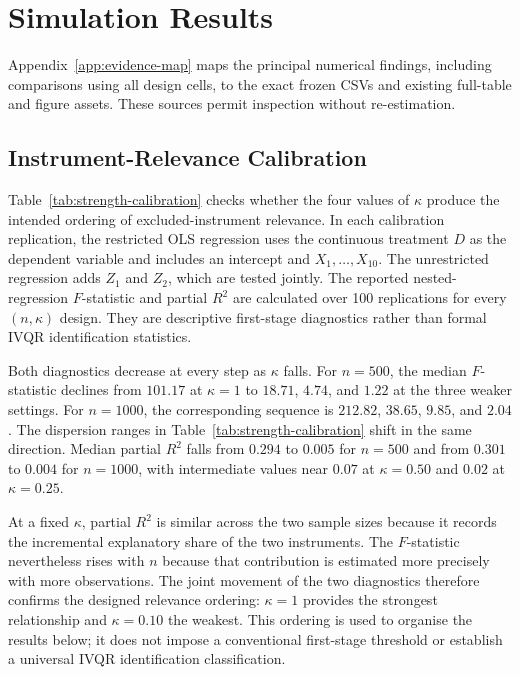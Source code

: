 \section{Simulation Results}
\label{chap:results}
Appendix~\ref{app:evidence-map} maps the principal numerical findings, including comparisons using all design cells, to the exact frozen CSVs and existing full-table and figure assets. These sources permit inspection without re-estimation.
\subsection{Instrument-Relevance Calibration}
\label{sec:results-relevance-calibration}

Table~\ref{tab:strength-calibration} checks whether the four values of $\kappa$ produce the intended ordering of excluded-instrument relevance. In each calibration replication, the restricted OLS regression uses the continuous treatment $D$ as the dependent variable and includes an intercept and $X_1,\ldots,X_{10}$. The unrestricted regression adds $Z_1$ and $Z_2$, which are tested jointly. The reported nested-regression $F$-statistic and partial $R^2$ are calculated over 100 replications for every $(n,\kappa)$ design. They are descriptive first-stage diagnostics rather than formal IVQR identification statistics.



Both diagnostics decrease at every step as $\kappa$ falls. For $n=500$, the median $F$-statistic declines from $101.17$ at $\kappa=1$ to $18.71$, $4.74$, and $1.22$ at the three weaker settings. For $n=1000$, the corresponding sequence is $212.82$, $38.65$, $9.85$, and $2.04$. The dispersion ranges in Table~\ref{tab:strength-calibration} shift in the same direction. Median partial $R^2$ falls from $0.294$ to $0.005$ for $n=500$ and from $0.301$ to $0.004$ for $n=1000$, with intermediate values near $0.07$ at $\kappa=0.50$ and $0.02$ at $\kappa=0.25$.

At a fixed $\kappa$, partial $R^2$ is similar across the two sample sizes because it records the incremental explanatory share of the two instruments. The $F$-statistic nevertheless rises with $n$ because that contribution is estimated more precisely with more observations. The joint movement of the two diagnostics therefore confirms the designed relevance ordering: $\kappa=1$ provides the strongest relationship and $\kappa=0.10$ the weakest. This ordering is used to organise the results below; it does not impose a conventional first-stage threshold or establish a universal IVQR identification classification.

